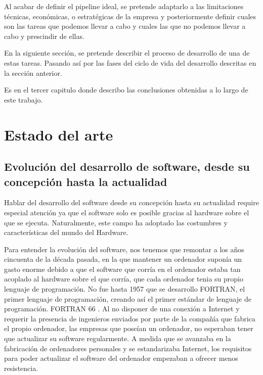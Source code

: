 \documentclass[12pt]{report} %
\begin{document}
Al acabar de definir el \gls{pipeline} ideal, se pretende adaptarlo a las
limitaciones técnicas, económicas, o estratégicas de la empresa y 
posteriormente definir cuales son las tareas que podemos llevar a cabo y cuales
las que no podemos llevar a cabo y prescindir de ellas.

En la siguiente sección, se pretende describir el proceso de desarrollo de una
de estas tareas.
Pasando así por las fases del ciclo de vida del desarrollo descritas en la sección anterior.

Es en el tercer capitulo donde describo las conclusiones obtenidas a lo largo 
de este trabajo.


\chapter{Estado del arte}

\section{Evolución del desarrollo de software, desde su concepción hasta la
actualidad}

Hablar del desarrollo del software desde su concepción hasta su actualidad
require especial atención ya que el software solo es posible gracias al hardware
sobre el que se ejecuta.  Naturalmente, este campo ha adoptado las costumbres y
características del mundo del Hardware.

Para entender la evolución del software, nos tenemos que remontar a los años
cincuenta de la década pasada, en la que mantener un ordenador suponía un gasto
enorme debido a que el software que corría en el ordenador estaba tan acoplado
al hardware sobre el que corría, que cada ordenador tenia su propio lenguaje de
programación.  No fue hasta 1957 que se desarrollo FORTRAN, el primer lenguaje
de programación, creando así el primer estándar de lenguaje de programación.
FORTRAN 66 \cite{FORTRAN1966}.  Al no disponer de una conexión a Internet y
requerir la presencia de ingenieros enviados por parte de la compañía que
fabrica el propio ordenador, las empresas que poseían un ordenador, no esperaban
tener que actualizar su software regularmente.  A medida que se avanzaba en la
fabricación de ordenadores personales y se estandarizaba Internet, los
requisitos para poder actualizar el software del ordenador empezaban a ofrecer
menos resistencia.
\end{document}
